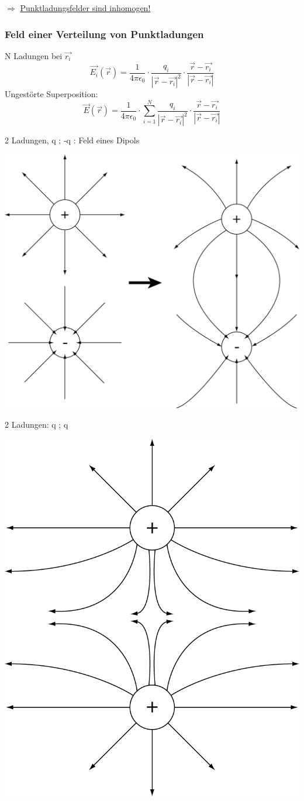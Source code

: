 \documentclass[11pt]{article}
\begin{document}
	$ \Rightarrow $ \underline{Punktladungsfelder sind inhomogen!}
	
	\subsubsection{Feld einer Verteilung von Punktladungen}
	N Ladungen bei $ \vec{r_i} $ 
	$$ \vec{E_i}(\vec{r}) = \frac{1}{4\pi\epsilon_0} \cdot \frac{q_i}{ | \vec{r} - \vec{r_i} |^2 } \cdot \frac{ \vec{r} - \vec{r_i}  }{ | \vec{r} - \vec{r_i}| }  $$
	Ungestörte Superposition:
	$$  \vec{E}(\vec{r}) = \frac{1}{4\pi\epsilon_0} \cdot {\displaystyle \sum_{i=1}^{N} \frac{q_i}{ | \vec{r} - \vec{r_i} |^2 } } \cdot \frac{ \vec{r} - \vec{r_i}  }{ | \vec{r} - \vec{r_i}| } $$
	\begin{minipage}{\textwidth}
		
		2 Ladungen, q ; -q : Feld eines Dipols 
		\begin{center}
			\includegraphics[width=0.4\linewidth]{skizzen/14/14_4B1}
		\end{center}
	
		2 Ladungen: q ; q 
		\begin{center}
			\includegraphics[width=0.4\linewidth]{skizzen/14/14_4B2}
		\end{center}
	
	\end{minipage}
	
\end{document}

